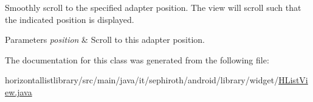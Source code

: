 Smoothly scroll to the specified adapter position. The view will scroll such that the indicated position is displayed.


\begin{DoxyParams}{Parameters}
{\em position} & Scroll to this adapter position. \\
\hline
\end{DoxyParams}


The documentation for this class was generated from the following file\+:\begin{DoxyCompactItemize}
\item 
horizontallistlibrary/src/main/java/it/sephiroth/android/library/widget/\hyperlink{_h_list_view_8java}{H\+List\+View.\+java}\end{DoxyCompactItemize}
